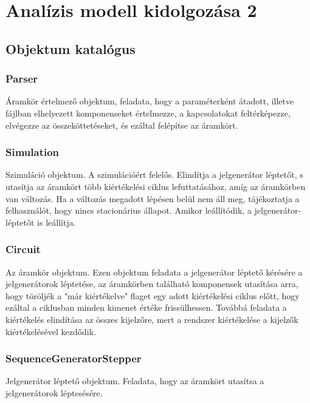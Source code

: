 %
\chapter{Analízis modell kidolgozása 2}

\thispagestyle{fancy}

\section{Objektum katalógus}

\subsection{\bf Parser}
Áramkör értelmező objektum, feladata, hogy a paraméterként átadott, illetve fájlban elhelyezett komponenseket értelmezze, a kapcsolatokat feltérképezze, elvégezze az összeköttetéseket, és ezáltal felépítse az áramkört.

\subsection{\bf Simulation}
Szimuláció objektum. A szimulációért felelős. Elindítja a jelgenerátor léptetőt, s utasítja az áramkört több kiértékelési ciklus lefuttatásához, amíg az áramkörben van változás. Ha a változás megadott lépésen belül nem áll meg, tájékoztatja a felhasználót, hogy nincs stacionárius állapot. Amikor leállítódik, a jelgenerátor-léptetőt is leállítja.

\subsection{\bf Circuit}
Az áramkör objektum. Ezen objektum feladata a jelgenerátor léptető kérésére a jelgenerátorok léptetése, az áramkörben található komponensek utasítása arra, hogy töröljék a "már kiértékelve" flaget egy adott kiértékelési ciklus előtt, hogy ezáltal a ciklusban minden kimenet értéke frissülhessen.
Továbbá feladata a kiértékelés elindítása az összes kijelzőre, mert a rendszer kiértékelése a kijelzők kiértékelésével kezdődik.

\subsection{\bf SequenceGeneratorStepper}
Jelgenerátor léptető objektum. Feladata, hogy az áramkört utasítsa a jelgenerátorok léptesésére.

